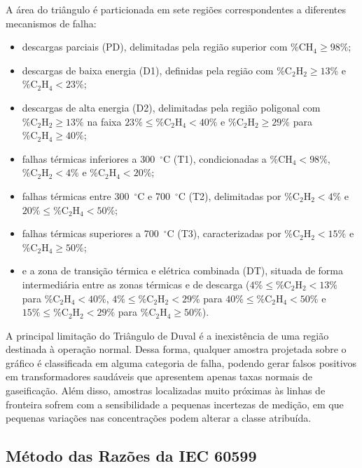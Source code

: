 A área do triângulo é particionada em sete regiões correspondentes a diferentes mecanismos de falha:

\begin{itemize}         
    \item descargas parciais (PD), delimitadas pela região superior com $\% \text{CH}_4 \ge 98\%$;
    \item descargas de baixa energia (D1), definidas pela região com $\% \text{C}_2\text{H}_2 \ge 13\%$ e $\% \text{C}_2\text{H}_4 < 23\%$;
    \item descargas de alta energia (D2), delimitadas pela região poligonal com $\% \text{C}_2\text{H}_2 \ge 13\%$ na faixa $23\% \le \% \text{C}_2\text{H}_4 < 40\%$ e $\% \text{C}_2\text{H}_2 \ge 29\%$ para $\% \text{C}_2\text{H}_4 \ge 40\%$;
    \item falhas térmicas inferiores a 300~$^\circ\text{C}$ (T1), condicionadas a $\% \text{CH}_4 < 98\%$, $\% \text{C}_2\text{H}_2 < 4\%$ e $\% \text{C}_2\text{H}_4 < 20\%$;
    \item falhas térmicas entre 300~$^\circ\text{C}$ e 700~$^\circ\text{C}$ (T2), delimitadas por $\% \text{C}_2\text{H}_2 < 4\%$ e $20\% \le \% \text{C}_2\text{H}_4 < 50\%$;
    \item falhas térmicas superiores a 700~$^\circ\text{C}$ (T3), caracterizadas por $\% \text{C}_2\text{H}_2 < 15\%$ e $\% \text{C}_2\text{H}_4 \ge 50\%$;
    \item e a zona de transição térmica e elétrica combinada (DT), situada de forma intermediária entre as zonas térmicas e de descarga ($4\% \le \% \text{C}_2\text{H}_2 < 13\%$ para $\% \text{C}_2\text{H}_4 < 40\%$, $4\% \le \% \text{C}_2\text{H}_2 < 29\%$ para $40\% \le \% \text{C}_2\text{H}_4 < 50\%$ e $15\% \le \% \text{C}_2\text{H}_2 < 29\%$ para $\% \text{C}_2\text{H}_4 \ge 50\%$).
\end{itemize}

A principal limitação do Triângulo de Duval é a inexistência de uma região destinada à operação normal. Dessa forma, qualquer amostra projetada sobre o gráfico é classificada em alguma categoria de falha, podendo gerar falsos positivos em transformadores saudáveis que apresentem apenas taxas normais de gaseificação. Além disso, amostras localizadas muito próximas às linhas de fronteira sofrem com a sensibilidade a pequenas incertezas de medição, em que pequenas variações nas concentrações podem alterar a classe atribuída.

\subsection{Método das Razões da IEC 60599}\label{sec:razoes_iec}

